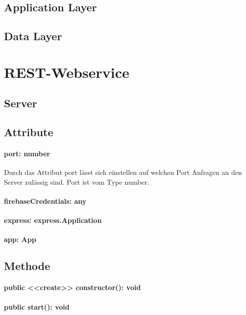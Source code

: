 \documentclass[parskip=full]{scrartcl}
\begin{document}
\newpage

\subsection{Application Layer}
\subsection{Data Layer}

\section{REST-Webservice}

\subsection{Server}
\subsection*{Attribute}
\paragraph{port: number} Durch das Attribut port lässt sich einstellen auf welchen Port Anfragen an den Server zulässig sind.
Port ist vom Type number.
\paragraph{firebaseCredentials: any}
\paragraph{express: express.Application}
\paragraph{app: App}
\paragraph{}

\subsection*{Methode}
\paragraph{public <<create>> constructor(): void}
\paragraph{public start(): void}
\end{document}
